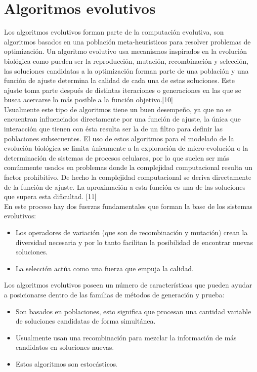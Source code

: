 \section{Algoritmos evolutivos}

Los algoritmos evolutivos forman parte de la computación evolutiva, son algoritmos basados en una población meta-heurísticos para resolver problemas de optimización. Un algoritmo evolutivo usa mecanismos inspirados en la evolución biológica como pueden ser la reproducción, mutación, recombinación y selección, las soluciones candidatas a la optimización forman parte de una población y una función de ajuste determina la calidad de cada una de estas soluciones. Este ajuste toma parte después de distintas iteraciones o generaciones en las que se busca acercarse lo más posible a la función objetivo.[10] \\

Usualmente este tipo de algoritmos tiene un buen desempeño, ya que no se encuentran influenciados directamente por una función de ajuste, la única que interacción que tienen con ésta resulta ser la de un filtro para definir las poblaciones subsecuentes. El uso de estos algoritmos para el modelado de la evolución biológica se limita únicamente a la exploración de micro-evolución o la determinación de sistemas de procesos celulares, por lo que suelen ser más comúnmente usados en problemas donde la complejidad computacional resulta un factor prohibitivo. De hecho la complejidad computacional se deriva directamente de la función de ajuste. La aproximación a esta función es una de las soluciones que supera esta dificultad. [11] \\

En este proceso hay dos fuerzas fundamentales que forman la base de los sistemas evolutivos: \\
\begin{itemize}
\item Los operadores de variación (que son de recombinación y mutación) crean la diversidad necesaria y por lo tanto facilitan la posibilidad de encontrar nuevas soluciones.
\item La selección actúa como una fuerza que empuja la calidad.
\end{itemize}

Los algoritmos evolutivos poseen un número de características que pueden ayudar a posicionarse dentro de las familias de métodos de generación y prueba:

\begin{itemize}
\item Son basados en poblaciones, esto significa que procesan una cantidad variable de soluciones candidatas de forma simultánea.
\item Usualmente usan una recombinación para mezclar la información de más candidatos en soluciones nuevas.
\item Estos algoritmos son estocásticos.
\end{itemize}


